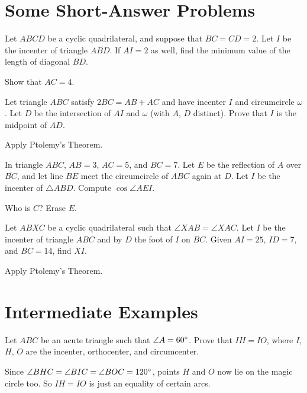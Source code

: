 \documentclass[11pt]{scrartcl}
\begin{document}
\section{Some Short-Answer Problems}
\begin{problem}
	[HMMT 2011] Let $ABCD$ be a cyclic quadrilateral, and suppose that $BC = CD = 2$. Let $I$ be the incenter of triangle $ABD$. If $AI = 2$ as well, find the minimum value of the length of diagonal $BD$.
	\begin{hint}
		Show that $AC = 4$.
	\end{hint}
\end{problem}
\begin{problem}
	[HMMT 2013] Let triangle $ABC$ satisfy $2BC = AB+AC$ and have incenter $I$ and circumcircle $\omega$. Let $D$ be the intersection of $AI$ and $\omega$ (with $A$, $D$ distinct). Prove that $I$ is the midpoint of $AD$.
	\begin{hint}
		Apply Ptolemy's Theorem.
	\end{hint}
\end{problem}

\begin{problem}
	 In triangle $ABC$, $AB=3$, $AC=5$, and $BC=7$. Let $E$ be the reflection of $A$ over $\overline{BC}$, and let line $BE$ meet the circumcircle of $ABC$ again at $D$. Let $I$ be the incenter of $\triangle ABD$. 
	Compute $\cos \angle AEI$.
	\begin{hint}
		Who is $C$? Erase $E$.
	\end{hint}
\end{problem}

\begin{problem}
	[NIMO 2012] Let $ABXC$ be a cyclic quadrilateral such that $\angle XAB = \angle XAC$.
	Let $I$ be the incenter of triangle $ABC$
	and by $D$ the foot of $I$ on $\overline{BC}$.
	Given $AI=25$, $ID = 7$, and $BC = 14$, find $XI$.
	\begin{hint}
		Apply Ptolemy's Theorem.
	\end{hint}
\end{problem}


\section{Intermediate Examples}
\begin{problem}
	Let $ABC$ be an acute triangle such that $\angle A = 60^\circ$.
	Prove that $IH = IO$, where $I$, $H$, $O$ are the incenter, orthocenter, and circumcenter.
	\begin{hint}
		Since $\angle BHC = \angle BIC = \angle BOC = 120^\circ$, points $H$ and $O$ now lie on the magic circle too.
		So $IH = IO$ is just an equality of certain arcs.
	\end{hint}
\end{problem}
\end{document}
